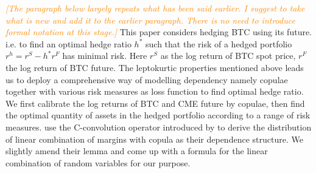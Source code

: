 \documentclass[11pt,a4paper,english]{article}
\providecommand{\natp}[1]{\textcolor{darkorange}{#1}}
\begin{document}
\natp{\em [The paragraph below largely repeats what has been said
  earlier. I suggest to take what is new and add it to the earlier
  paragraph. There is no need to introduce formal notation at this stage.]}
This paper considers hedging BTC using its future. %
i.e. to find an optimal hedge ratio $h^*$ such that the risk of a hedged portfolio $r^h = r^S - h^*r^F$ has
minimal risk.
Here $r^S$ as the log return of BTC spot price, $r^F$ the log return of BTC future.
The leptokurtic properties mentioned above leads us to deploy a comprehensive way of modelling dependency namely copulae together with various risk measures as loss function to find optimal hedge ratio.
We first calibrate the log returns of BTC and CME future by copulae,
then find the optimal quantity of assets in the hedged portfolio according to a range of risk measures.
\citet{barbi2014copula} use the C-convolution operator introduced by \citet{cherubini2011copula} to derive the distribution
of linear combination of margins with copula as their dependence structure.
We slightly amend their lemma and come up with a formula for the linear combination of random variables for our purpose.\medskip
%
%
\end{document}
